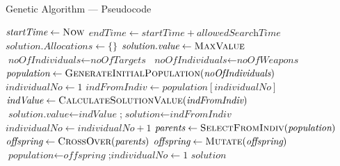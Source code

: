 \documentclass[aspectratio=169,10pt]{beamer}
\begin{document}
\begin{frame}[shrink=20]{Genetic Algorithm --- Pseudocode}
  \begin{center}
  {\footnotesize
  \begin{algorithm}[H]
    \caption{Genetic Algorithm}
    \begin{algorithmic}[1]
      \State $\textit{startTime} \leftarrow \textsc{Now}$
      \State $\textit{endTime} \leftarrow \textit{startTime} + \textit{allowedSearchTime}$
      \State $\textit{solution.Allocations} \leftarrow \{\}$
      \State $\textit{solution.value} \leftarrow \textsc{MaxValue}$
        \State $\textit{noOfIndividuals} \leftarrow \textit{noOfTargets}$
      \Else
        \State $\textit{noOfIndividuals} \leftarrow \textit{noOfWeapons}$
      \EndIf
      \State $\textit{population} \leftarrow \textsc{GenerateInitialPopulation}(\textit{noOfIndividuals})$
      \State $\textit{individualNo} \leftarrow 1$
        \State $\textit{indFromIndiv} \leftarrow \textit{population}[\textit{individualNo}]$
        \State $\textit{indValue} \leftarrow \textsc{CalculateSolutionValue}(\textit{indFromIndiv})$
          \State $\textit{solution.value} \leftarrow \textit{indValue}$;\quad $\textit{solution} \leftarrow \textit{indFromIndiv}$
        \EndIf
        \State $\textit{individualNo} \leftarrow \textit{individualNo} + 1$
          \State $\textit{parents} \leftarrow \textsc{SelectFromIndiv}(\textit{population})$
          \State $\textit{offspring} \leftarrow \textsc{CrossOver}(\textit{parents})$
          \State $\textit{offspring} \leftarrow \textsc{Mutate}(\textit{offspring})$
          \State $\textit{population} \leftarrow \textit{offspring}$;\quad $\textit{individualNo} \leftarrow 1$
        \EndIf
      \EndWhile
      \State \Return $\textit{solution}$
    \end{algorithmic}
  \end{algorithm}
  }
  \end{center}
\end{frame}

\end{document}
